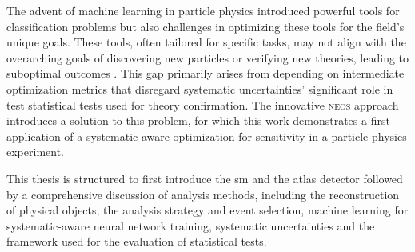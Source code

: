 The advent of machine learning in particle physics introduced powerful tools for classification problems but also challenges in optimizing these tools for the field's unique goals. These tools, often tailored for specific tasks, may not align with the overarching goals of discovering new particles or verifying new theories, leading to suboptimal outcomes \citep{guest2018deep}. This gap primarily arises from depending on intermediate optimization metrics that disregard systematic uncertainties' significant role in test statistical tests used for theory confirmation. The innovative \textsc{neos} approach \citep{Simpson_2023} introduces a solution to this problem, for which this work demonstrates a first application of a systematic-aware optimization for sensitivity in a particle physics experiment.

This thesis is structured to first introduce the \ac{sm} and the \ac{atlas} detector followed by a comprehensive discussion of analysis methods, including the reconstruction of physical objects, the analysis strategy and event selection, machine learning for systematic-aware neural network training, systematic uncertainties and the framework used for the evaluation of statistical tests. 












